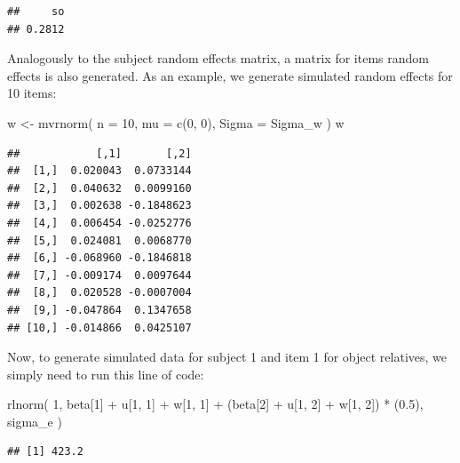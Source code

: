 \documentclass[
  12pt,
]{krantz}
\newenvironment{Shaded}{\begin{snugshade}}{\end{snugshade}}
\newcommand{\AttributeTok}[1]{\textcolor[rgb]{0.77,0.63,0.00}{#1}}
\newcommand{\DecValTok}[1]{\textcolor[rgb]{0.00,0.00,0.81}{#1}}
\newcommand{\FloatTok}[1]{\textcolor[rgb]{0.00,0.00,0.81}{#1}}
\newcommand{\FunctionTok}[1]{\textcolor[rgb]{0.00,0.00,0.00}{#1}}
\newcommand{\NormalTok}[1]{#1}
\newcommand{\OtherTok}[1]{\textcolor[rgb]{0.56,0.35,0.01}{#1}}
\newcommand{\SpecialCharTok}[1]{\textcolor[rgb]{0.00,0.00,0.00}{#1}}
\theoremstyle{definition}
\theoremstyle{definition}
\theoremstyle{definition}
\theoremstyle{definition}
\theoremstyle{remark}
\begin{document}
\begin{verbatim}
##     so 
## 0.2812
\end{verbatim}

Analogously to the subject random effects matrix, a matrix for items random effects is also generated. As an example, we generate simulated random effects for 10 items:

\begin{Shaded}
\begin{Highlighting}[]
\NormalTok{w }\OtherTok{\textless{}{-}} \FunctionTok{mvrnorm}\NormalTok{(}
  \AttributeTok{n =} \DecValTok{10}\NormalTok{,}
  \AttributeTok{mu =} \FunctionTok{c}\NormalTok{(}\DecValTok{0}\NormalTok{, }\DecValTok{0}\NormalTok{), }\AttributeTok{Sigma =}\NormalTok{ Sigma\_w}
\NormalTok{)}
\NormalTok{w}
\end{Highlighting}
\end{Shaded}

\begin{verbatim}
##            [,1]       [,2]
##  [1,]  0.020043  0.0733144
##  [2,]  0.040632  0.0099160
##  [3,]  0.002638 -0.1848623
##  [4,]  0.006454 -0.0252776
##  [5,]  0.024081  0.0068770
##  [6,] -0.068960 -0.1846818
##  [7,] -0.009174  0.0097644
##  [8,]  0.020528 -0.0007004
##  [9,] -0.047864  0.1347658
## [10,] -0.014866  0.0425107
\end{verbatim}

Now, to generate simulated data for subject 1 and item 1 for object relatives, we simply need to run this line of code:

\begin{Shaded}
\begin{Highlighting}[]
\FunctionTok{rlnorm}\NormalTok{(}
  \DecValTok{1}\NormalTok{, beta[}\DecValTok{1}\NormalTok{] }\SpecialCharTok{+}\NormalTok{ u[}\DecValTok{1}\NormalTok{, }\DecValTok{1}\NormalTok{] }\SpecialCharTok{+}\NormalTok{ w[}\DecValTok{1}\NormalTok{, }\DecValTok{1}\NormalTok{] }\SpecialCharTok{+}
\NormalTok{    (beta[}\DecValTok{2}\NormalTok{] }\SpecialCharTok{+}\NormalTok{ u[}\DecValTok{1}\NormalTok{, }\DecValTok{2}\NormalTok{] }\SpecialCharTok{+}\NormalTok{ w[}\DecValTok{1}\NormalTok{, }\DecValTok{2}\NormalTok{]) }\SpecialCharTok{*}\NormalTok{ (}\FloatTok{0.5}\NormalTok{),}
\NormalTok{  sigma\_e}
\NormalTok{)}
\end{Highlighting}
\end{Shaded}

\begin{verbatim}
## [1] 423.2
\end{verbatim}
\end{document}
